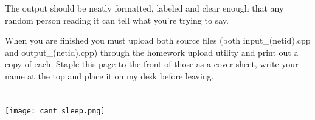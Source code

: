 \documentclass[letterpaper,12pt]{article}
\begin{document}
The output should be neatly formatted, labeled and clear enough
that any random person reading it can tell what you're trying to
say.

When you are finished you must upload both source files (both input\_(netid).cpp and output\_(netid).cpp)
through the homework upload utility and print out a copy of each.
Staple this page to the front of those as a cover sheet, write your
name at the top and place it on my desk before leaving.
\section*{}
\texttt{[image: cant\_sleep.png]}
\end{document}

